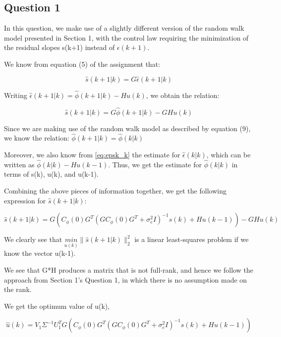 \documentclass[12pt]{report}
\begin{document}
\subsection*{Question 1}

In this question, we make use of a slightly different version of the random walk model presented in Section 1, with the control law requiring the minimization of the residual slopes s(k+1) instead of $\epsilon(k+1)$.

We know from equation (5) of the assignment that:

\begin{equation*}
\hat{s}(k+1|k) = G\hat\epsilon(k+1|k)
\end{equation*}

Writing $\hat\epsilon(k+1|k) = \hat\phi(k+1|k) - Hu(k)$, we obtain the relation:

\begin{equation*}
\hat{s}(k+1|k) = G\hat\phi(k+1|k) - GHu(k)
\end{equation*}

Since we are making use of the random walk model as described by equation (9), we know the relation: $\hat\phi(k+1|k) = \hat\phi(k|k)$

Moreover, we also know from \ref{eq:epsk_k} the estimate for $\hat\epsilon(k|k)$, which can be written as $\hat\phi(k|k) - Hu(k-1)$. Thus, we get the estimate for $\hat\phi(k|k)$ in terms of s(k), u(k), and u(k-1).

Combining the above pieces of information together, we get the following expression for $\hat{s}(k+1|k)$:

\begin{equation*}
\hat s(k+1|k) = G\left( C_{\phi}(0)G^{T}(GC_{\phi}(0)G^{T} + \sigma_{e}^{2}I)^{-1}s(k) + Hu(k-1)\right) - GHu(k)
\end{equation*}

We clearly see that $\underset{u(k)}{min}\|\hat s(k+1|k)\|_{2}^{2}$ is a linear least-squares problem if we know the vector u(k-1).

We see that G*H produces a matrix that is not full-rank, and hence we follow the approach from Section 1's Question 1, in which there is no assumption made on the rank.

We get the optimum value of u(k), 

\begin{equation*}
\hat{u}(k) = V_{1}\Sigma^{-1}U_{1}^{T}G\left( C_{\phi}(0)G^{T}(GC_{\phi}(0)G^{T} + \sigma_{e}^{2}I)^{-1}s(k) + Hu(k-1)\right)
\end{equation*}
\end{document}
